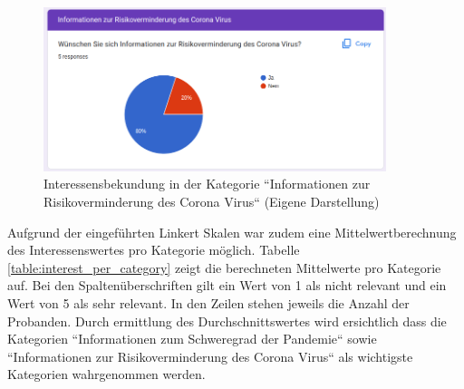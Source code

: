 \begin{figure}[h]
    \includegraphics[width=10cm]{images/online_formular_evaluation_risk_mitigation.png}
    \centering
    \caption{Interessensbekundung in der Kategorie ``Informationen zur Risikoverminderung des Corona Virus`` (Eigene Darstellung)}
    \label{fig:online_formular_evaluation_risk_mitigation}
\end{figure}

\clearpage
Aufgrund der eingeführten Linkert Skalen war zudem eine Mittelwertberechnung des Interessenswertes pro  Kategorie möglich. Tabelle \ref{table:interest_per_category} zeigt die berechneten Mittelwerte pro Kategorie auf. Bei den Spaltenüberschriften gilt ein Wert von 1 als nicht relevant und ein Wert von 5 als sehr relevant. In den Zeilen stehen jeweils die Anzahl der Probanden. Durch ermittlung des Durchschnittswertes wird ersichtlich dass die Kategorien ``Informationen zum Schweregrad der Pandemie`` sowie ``Informationen zur Risikoverminderung des Corona Virus`` als wichtigste Kategorien wahrgenommen werden.

\begin{table}[h]
\centering
{}
\caption{Interessenzrelevanz der Probanden pro Kategorie (Eigene Darstellung)}
\label{table:interest_per_category}
\end{table}


